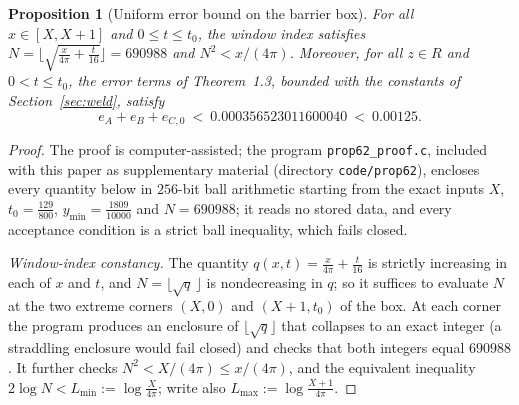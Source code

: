 \documentclass[11pt]{article}
\newtheorem{proposition}[theorem]{Proposition}
\theoremstyle{definition}
\begin{document}
\begin{proposition}[Uniform error bound on the barrier box]\label{prop:barriererr}
For all $x\in[X,X+1]$ and $0\le t\le t_0$, the window index satisfies
$N=\bigl\lfloor\sqrt{\frac{x}{4\pi}+\frac t{16}}\bigr\rfloor=690988$
and $N^2<x/(4\pi)$. Moreover, for all $z\in R$ and $0<t\le t_0$, the
error terms of Theorem~1.3, bounded with the constants of
Section~\ref{sec:weld}, satisfy
\begin{equation}\label{eq:barriererror}
e_A+e_B+e_{C,0}\ <\ 0.000356523011600040\ <\ 0.00125 .
\end{equation}
\end{proposition}

\begin{proof}
The proof is computer-assisted; the program
\texttt{prop62\_proof.c}, included with this paper as
supplementary material (directory \texttt{code/prop62}), encloses
every quantity below in
$256$-bit ball arithmetic starting from the exact inputs $X$,
$t_0=\frac{129}{800}$, $y_{\min}=\frac{1809}{10000}$ and
$N=690988$; it reads no stored data, and every acceptance
condition is a strict ball inequality, which fails closed.

\emph{Window-index constancy.} The quantity
$q(x,t)=\frac{x}{4\pi}+\frac t{16}$ is strictly increasing in each
of $x$ and $t$, and $N=\lfloor\sqrt{q}\,\rfloor$ is nondecreasing
in $q$; so it suffices to evaluate $N$ at the two extreme corners
$(X,0)$ and $(X+1,t_0)$ of the box. At each corner the program
produces an enclosure of $\lfloor\sqrt q\rfloor$ that collapses to
an exact integer (a straddling enclosure would fail closed) and
checks that both integers equal $690988$. It further checks
$N^2<X/(4\pi)\le x/(4\pi)$, and the equivalent inequality
$2\log N<L_{\min}:=\log\frac X{4\pi}$; write also
$L_{\max}:=\log\frac{X+1}{4\pi}$.


\end{proof}
\end{document}
